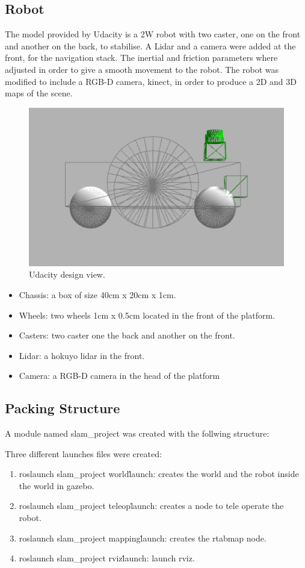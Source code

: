 \documentclass[10pt,journal,compsoc]{IEEEtran}
\begin{document}
\subsection{Robot}
The model provided by Udacity is a 2W robot with two caster, one on the front and another on the back, to stabilise. A Lidar and a camera were added at the front, for the navigation stack. The inertial and friction parameters where adjusted in order to give a smooth movement to the robot. The robot was modified to include a RGB-D camera, kinect, in order to produce a 2D and 3D maps of the scene.
\begin{figure}[h]
\centering
\includegraphics[scale=0.33]{udacity-design-2}
\caption{Udacity design view.}
\label{fig:mesh1}
\end{figure}
\begin{itemize}
\item Chassis: a box of size 40cm x 20cm x 1cm.
\item Wheels: two wheels 1cm x 0.5cm located in the front of the platform.
\item Casters: two caster one the back and another on the front.
\item Lidar: a hokuyo lidar in the front.
\item Camera: a RGB-D camera in the head of the platform
\end{itemize}
\subsection{Packing Structure}
A module named slam\_project was created with the follwing structure:

Three different launches files were created:
\begin{enumerate}
\item roslaunch slam\_project world\.launch: creates the world and the robot inside the world in gazebo.
\item roslaunch slam\_project teleop\.launch: creates a node to tele operate the robot. 
\item roslaunch slam\_project mapping\.launch: creates the rtabmap node.
\item roslaunch slam\_project rviz\.launch: launch rviz.
\end{enumerate}
\end{document}
